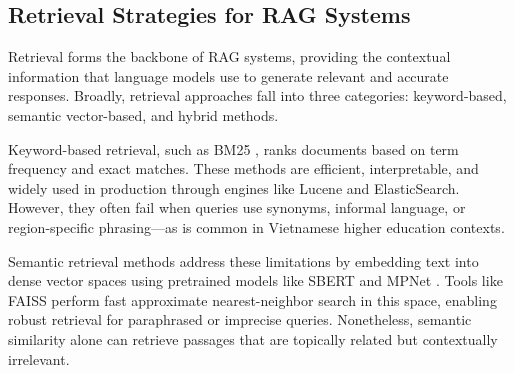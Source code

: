 \documentclass[runningheads]{llncs}
\begin{document}
\begin{table}[ht]
\centering
{}
\caption{Overview of Retrieval-Augmented Generation configurations used in recent studies.}
\label{tab:rag-configs}
\end{table}

\subsection{Retrieval Strategies for RAG Systems}
\label{sec:retrieval-strategies}

Retrieval forms the backbone of RAG systems, providing the contextual information that language models use to generate relevant and accurate responses. Broadly, retrieval approaches fall into three categories: keyword-based, semantic vector-based, and hybrid methods.

Keyword-based retrieval, such as BM25 \cite{robertson_probabilistic_2009}, ranks documents based on term frequency and exact matches. These methods are efficient, interpretable, and widely used in production through engines like Lucene and ElasticSearch. However, they often fail when queries use synonyms, informal language, or region-specific phrasing—as is common in Vietnamese higher education contexts.

Semantic retrieval methods address these limitations by embedding text into dense vector spaces using pretrained models like SBERT \cite{reimers_sentence-bert_2019} and MPNet \cite{song_mpnet_2020}. Tools like FAISS perform fast approximate nearest-neighbor search in this space, enabling robust retrieval for paraphrased or imprecise queries. Nonetheless, semantic similarity alone can retrieve passages that are topically related but contextually irrelevant.
\end{document}
